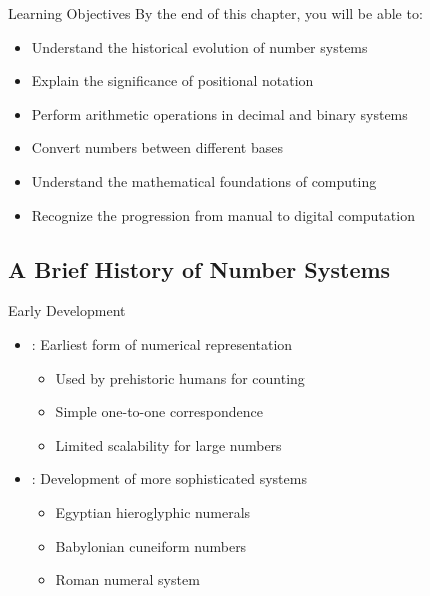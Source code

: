 
\begin{frame}{Learning Objectives}
By the end of this chapter, you will be able to:
\begin{itemize}
\item Understand the historical evolution of number systems
\item Explain the significance of positional notation
\item Perform arithmetic operations in decimal and binary systems
\item Convert numbers between different bases
\item Understand the mathematical foundations of computing
\item Recognize the progression from manual to digital computation
\end{itemize}
\end{frame}

\subsection{A Brief History of Number Systems}

\begin{frame}{Early Development}
\begin{itemize}
\item {}: Earliest form of numerical representation
\begin{itemize}
\item Used by prehistoric humans for counting
\item Simple one-to-one correspondence
\item Limited scalability for large numbers
\end{itemize}
\vspace{0.5cm}
\item {}: Development of more sophisticated systems
\begin{itemize}
\item Egyptian hieroglyphic numerals
\item Babylonian cuneiform numbers
\item Roman numeral system
\end{itemize}
\end{itemize}
\end{frame}

